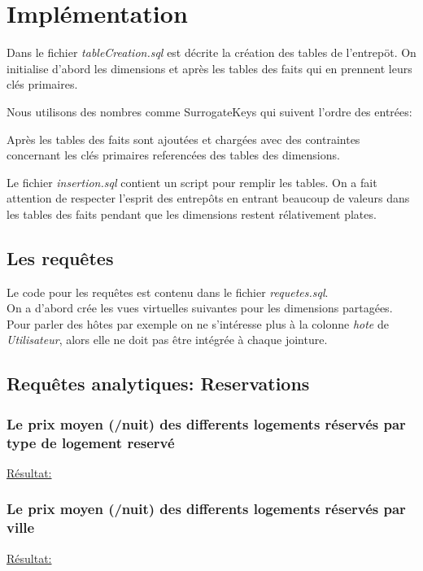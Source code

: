 \documentclass[11pt]{article}
\begin{document}
\section{Implémentation}
Dans le fichier \textit{tableCreation.sql} est décrite la création des tables de l'entrepöt. On initialise d'abord les dimensions et après les tables des faits qui en prennent leurs clés primaires.

Nous utilisons des nombres comme SurrogateKeys qui suivent l'ordre des entrées:

Après les tables des faits sont ajoutées et chargées avec des contraintes concernant les clés primaires referencées des tables des dimensions.

Le fichier \textit{insertion.sql} contient un script pour remplir les tables. On a fait attention de respecter l'esprit des entrepôts en entrant beaucoup de valeurs dans les tables des faits pendant que les dimensions restent rélativement plates.
\subsection{Les requêtes}
Le code pour les requêtes est contenu dans le fichier \textit{requetes.sql}.\\
On a d'abord crée les vues virtuelles suivantes pour les dimensions partagées. Pour parler des hôtes par exemple on ne s'intéresse plus à la colonne \textit{hote} de \textit{Utilisateur}, alors elle ne doit pas être intégrée à chaque jointure.

\subsection*{Requêtes analytiques: Reservations}
\subsubsection*{Le prix moyen (/nuit) des differents logements réservés par type de logement reservé}

\underline{Résultat:}

\subsubsection*{Le prix moyen (/nuit) des differents logements réservés par ville}

\underline{Résultat:}

\end{document}
